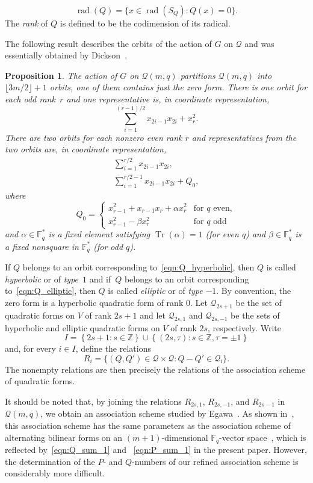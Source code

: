 \documentclass[10pt]{article}
\newtheorem{prop}[theorem]{Proposition}
\theoremstyle{definition}
\newcommand{\FF}{\mathbb{F}}
\newcommand{\ZZ}{\mathbb{Z}}
\newcommand{\Q}{\mathscr{Q}}
\renewcommand{\t}{\tau}
\newcommand{\floor}[1]{\lfloor#1\rfloor}
\DeclareMathOperator{\rad}{rad}
\DeclareMathOperator{\Tr}{Tr}
\begin{document}
\[
\rad(Q)=\{x\in \rad(S_Q):Q(x)=0\}.
\]
The \emph{rank} of $Q$ is defined to be the codimension of its radical.
\par
The following result describes the orbits of the action of $G$ on $\Q$ and was essentially obtained by Dickson~\cite{Dic1958}.
\begin{prop}
\label{pro:canonical_quad_forms}
The action of $G$ on $\Q(m,q)$ partitions $\Q(m,q)$ into $\floor{3m/2}+1$ orbits, one of them contains just the zero form. There is one orbit for each odd rank~$r$ and one representative is, in coordinate representation, 
\[
\sum_{i=1}^{(r-1)/2}x_{2i-1}x_{2i}+x_r^2.
\]
There are two orbits for each nonzero even rank $r$ and representatives from the two orbits are, in coordinate representation,
\begin{gather}
\sum_{i=1}^{r/2}x_{2i-1}x_{2i},   \label{eqn:Q_hyperbolic}\\
\sum_{i=1}^{r/2-1}x_{2i-1}x_{2i}+Q_0,   \label{eqn:Q_elliptic}
\end{gather}
where
\[
Q_0=\begin{cases}
x_{r-1}^2+x_{r-1}x_r+\alpha x_r^2  & \text{for $q$ even},\\
x_{r-1}^2-\beta x_r^2              & \text{for $q$ odd}
\end{cases}
\]
and $\alpha\in\FF_q^*$ is a fixed element satisfying $\Tr(\alpha)=1$ (for even $q$) and $\beta\in\FF_q^*$ is a fixed nonsquare in $\FF_q^*$ (for odd $q$). 
\end{prop}
\par
{}
If $Q$ belongs to an orbit corresponding to~\eqref{eqn:Q_hyperbolic}, then $Q$ is called \emph{hyperbolic} or of \emph{type}~$1$ and if~$Q$ belongs to an orbit corresponding to~\eqref{eqn:Q_elliptic}, then $Q$ is called \emph{elliptic} or of \emph{type} $-1$. By convention, the zero form is a hyperbolic quadratic form of rank $0$. Let $\Q_{2s+1}$ be the set of quadratic forms on $V$ of rank ${2s+1}$ and let $\Q_{2s,1}$ and $\Q_{2s,-1}$ be the sets of hyperbolic and elliptic quadratic forms on $V$ of rank $2s$, respectively. Write
\[
I=\left\{2s+1:s\in\ZZ\right\}\cup \left\{(2s,\t):s\in\ZZ,\t=\pm 1\right\}
\]
and, for every $i\in I$, define the relations 
\begin{equation}
R_i=\{(Q,Q')\in\Q\times \Q:Q-Q'\in \Q_i\}.   \label{eqn:relations_Q}
\end{equation}
The nonempty relations are then precisely the relations of the association scheme of quadratic forms. 
\par
It should be noted that, by joining the relations $R_{2s,1}$, $R_{2s,-1}$, and $R_{2s-1}$ in $\Q(m,q)$, we obtain an association scheme studied by Egawa~\cite{Ega1985}. As shown in~\cite{Ega1985}, this association scheme has the same parameters as the association scheme of alternating bilinear forms on an $(m+1)$-dimensional $\FF_q$-vector space~\cite{DelGoe1975}, which is reflected by~\eqref{eqn:Q_sum_1} and ~\eqref{eqn:P_sum_1} in the present paper. However, the determination of the $P$- and $Q$-numbers of our refined association scheme is considerably more difficult.
\end{document}
